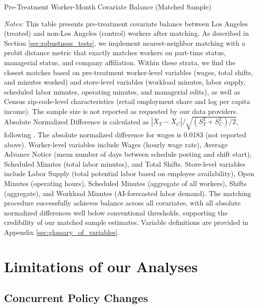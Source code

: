 \documentclass[letterpaper,11pt,leqno]{article}
\theoremstyle{paper}
\newcommand{\note}[2][]{\parbox{\textwidth}{\footnotesize\vspace*{10pt}\textit{#1}#2}}
\begin{document}
\begin{singlespace}
\begin{table}[H]
\caption{Pre-Treatment Worker-Month Covariate Balance (Matched Sample)}

\note{\scriptsize\textit{Notes: } This table presents pre-treatment covariate balance between Los Angeles (treated) and non-Los Angeles (control) workers after matching. As described in Section \ref{sec:robustness_tests}, we implement nearest-neighbor matching with a probit distance metric that exactly matches workers on part-time status, managerial status, and company affiliation. Within these strata, we find the closest matches based on pre-treatment worker-level variables (wages, total shifts, and minutes worked) and store-level variables (workload minutes, labor supply, scheduled labor minutes, operating minutes, and managerial edits), as well as Census zip-code-level characteristics (retail employment share and log per capita income). The sample size is not reported as requested by our data providers. Absolute Normalized Difference is calculated as $|\bar{X}_T - \bar{X}_C|/\sqrt{(S^2_T + S^2_C)/2}$, following \cite{imbens2015causal}.  The absolute normalized difference for wages is 0.0183 (not reported above). Worker-level variables include Wages (hourly wage rate), Average Advance Notice (mean number of days between schedule posting and shift start), Scheduled Minutes (total labor minutes), and Total Shifts. Store-level variables include Labor Supply (total potential labor based on employee availability), Open Minutes (operating hours), Scheduled Minutes (aggregate of all workers), Shifts (aggregate), and Workload Minutes (AI-forecasted labor demand). The matching procedure successfully achieves balance across all covariates, with all absolute normalized differences well below conventional thresholds, supporting the credibility of our matched sample estimates. Variable definitions are provided in Appendix \ref{sec:glossary_of_variables}.}
\label{table:worker_summary_wide_matched}
\end{table}
\end{singlespace}




\pagebreak 
\section{Limitations of our Analyses} \label{sec:limitations}
\subsection{Concurrent Policy Changes}
\end{document}
